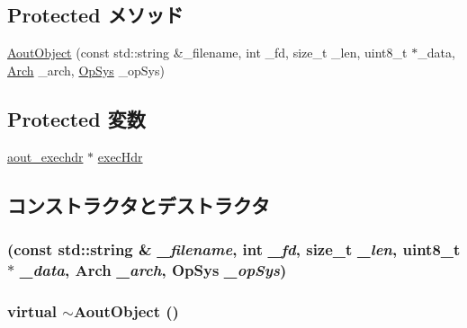 \subsection*{Protected メソッド}
\begin{DoxyCompactItemize}
\item 
\hyperlink{classAoutObject_a6fd834371548242e30ba0a8af5e3a527}{AoutObject} (const std::string \&\_\-filename, int \_\-fd, size\_\-t \_\-len, uint8\_\-t $\ast$\_\-data, \hyperlink{classObjectFile_a0ac03ab06a859320a9072002bdf3aa0f}{Arch} \_\-arch, \hyperlink{classObjectFile_aafc438343baf22e5884dde40c41331e8}{OpSys} \_\-opSys)
\end{DoxyCompactItemize}
\subsection*{Protected 変数}
\begin{DoxyCompactItemize}
\item 
\hyperlink{structaout__exechdr}{aout\_\-exechdr} $\ast$ \hyperlink{classAoutObject_a786112463f52f34ed17a1cb92de0b500}{execHdr}
\end{DoxyCompactItemize}


\subsection{コンストラクタとデストラクタ}
\hypertarget{classAoutObject_a6fd834371548242e30ba0a8af5e3a527}{
\subsubsection[{AoutObject}]{ (const std::string \& {\em \_\-filename}, \/  int {\em \_\-fd}, \/  size\_\-t {\em \_\-len}, \/  uint8\_\-t $\ast$ {\em \_\-data}, \/  {\bf Arch} {\em \_\-arch}, \/  {\bf OpSys} {\em \_\-opSys})}}
\label{classAoutObject_a6fd834371548242e30ba0a8af5e3a527}
\hypertarget{classAoutObject_a7062369914ccdd09ee239a41c0d42c9a}{
\subsubsection[{$\sim$AoutObject}]{\setlength{\rightskip}{0pt plus 5cm}virtual $\sim${\bf AoutObject} ()}}
\label{classAoutObject_a7062369914ccdd09ee239a41c0d42c9a}



